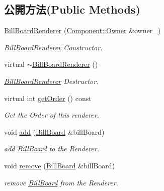 \subsection*{公開方法(Public Methods)}
\begin{DoxyCompactItemize}
\item 
\hyperlink{class_i_dream_sky_1_1_bill_board_renderer_afb0b058c05103a7c459eac5b8ab66acf}{Bill\+Board\+Renderer} (\hyperlink{class_i_dream_sky_1_1_component_1_1_owner}{Component\+::\+Owner} \&owner\+\_\+)
\begin{DoxyCompactList}\small\item\em \hyperlink{class_i_dream_sky_1_1_bill_board_renderer}{Bill\+Board\+Renderer} Constructor. \end{DoxyCompactList}\item 
virtual \hyperlink{class_i_dream_sky_1_1_bill_board_renderer_a768f1b1a80b526eb3f9245c04ad95ca5}{$\sim$\+Bill\+Board\+Renderer} ()
\begin{DoxyCompactList}\small\item\em \hyperlink{class_i_dream_sky_1_1_bill_board_renderer}{Bill\+Board\+Renderer} Destructor. \end{DoxyCompactList}\item 
virtual int \hyperlink{class_i_dream_sky_1_1_bill_board_renderer_a5ce38348110a2f7861f4ec2427518100}{get\+Order} () const 
\begin{DoxyCompactList}\small\item\em Get the Order of this renderer. \end{DoxyCompactList}\item 
void \hyperlink{class_i_dream_sky_1_1_bill_board_renderer_a4580bfbed3e76d2e4c17e8a328f5ce5e}{add} (\hyperlink{class_i_dream_sky_1_1_bill_board}{Bill\+Board} \&bill\+Board)
\begin{DoxyCompactList}\small\item\em add \hyperlink{class_i_dream_sky_1_1_bill_board}{Bill\+Board} to the Renderer. \end{DoxyCompactList}\item 
void \hyperlink{class_i_dream_sky_1_1_bill_board_renderer_a551846a61bfad0c3104bd75136e37a7e}{remove} (\hyperlink{class_i_dream_sky_1_1_bill_board}{Bill\+Board} \&bill\+Board)
\begin{DoxyCompactList}\small\item\em remove \hyperlink{class_i_dream_sky_1_1_bill_board}{Bill\+Board} from the Renderer. \end{DoxyCompactList}\end{DoxyCompactItemize}
